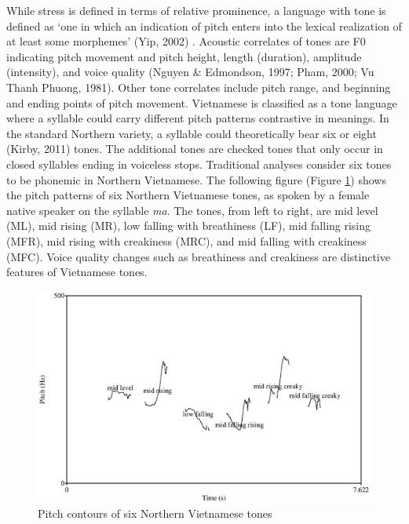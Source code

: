 \documentclass[a4paper]{article}
\begin{document}
While stress is defined in terms of relative prominence, a language with tone is defined as ‘one in which an indication of pitch enters into the lexical realization of at least some morphemes' (Yip, 2002) \cite{Yip:2002aa}. Acoustic correlates of tones are F0 indicating pitch movement and pitch height, length (duration), amplitude (intensity), and voice quality (Nguyen \& Edmondson, 1997; Pham, 2000; Vu Thanh Phuong, 1981). %
Other tone correlates include pitch range, and beginning and ending points of pitch movement. 
Vietnamese is classified as a tone language where a syllable could carry different pitch patterns contrastive in meanings. In the standard Northern variety, a syllable could theoretically bear six or eight (Kirby, 2011) tones. The additional tones are checked tones that only occur in closed syllables ending in voiceless stops. Traditional analyses consider six tones to be phonemic in Northern Vietnamese. The following figure (Figure \ref{fig:tones}) shows the pitch patterns of six Northern Vietnamese tones, as spoken by a female native speaker on the syllable \textit{ma}. The tones, from left to right, are mid level (ML), mid rising (MR), low falling with breathiness (LF), mid falling rising (MFR), mid rising with creakiness (MRC), and mid falling with creakiness (MFC). Voice quality changes such as breathiness and creakiness are distinctive features of Vietnamese tones.

\begin{figure}[!h]
\begin{center}  
\includegraphics[scale=1.0]{praat.eps} 
\caption{Pitch contours of six Northern Vietnamese tones}
\label{fig:tones}
\end{center}   
\end{figure}
\end{document}
